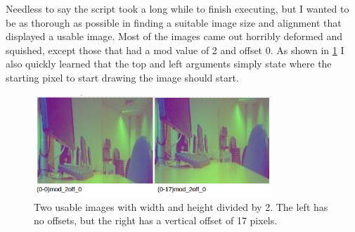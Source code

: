 \documentclass[11pt]{article} %
\begin{document}
{{Needless to say the script took a long while to finish executing, but I wanted to be as thorough as possible in finding a suitable image size and alignment that displayed a usable image. Most of the images came out horribly deformed and squished, except those that had a mod value of 2 and offset 0. As shown in \cref{fig:shell1} I also quickly learned that the top and left arguments simply state where the starting pixel to start drawing the image should start.
\begin{figure}[H]
	\begin{center}
		\includegraphics[width=0.8\textwidth]{../images/qpix/shell1}
	\end{center}
	\vspace{-20pt}
	\caption{Two usable images with width and height divided by 2. The left has no offsets, but the right has a vertical offset of 17 pixels. }
	\label{fig:shell1}
	\vspace{-30pt}
\end{figure}

}}
\end{document}
